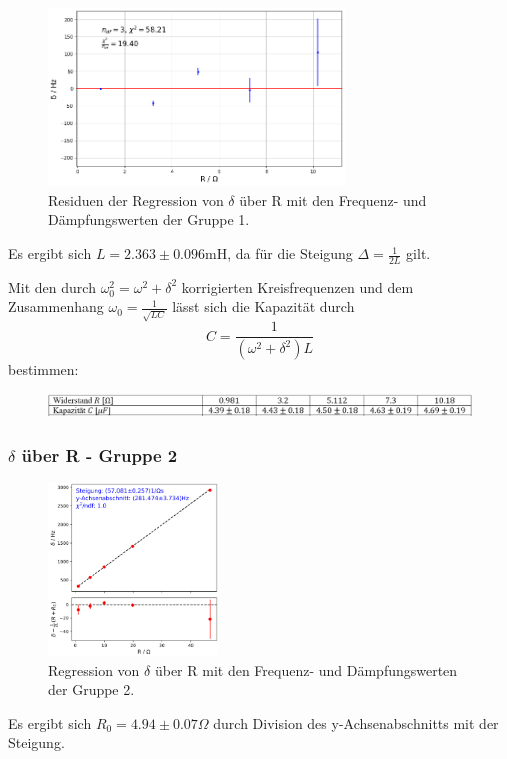 \documentclass{beamer}
\begin{document}
\begin{frame}
\begin{figure}
\centering
\includegraphics[width=0.7\textwidth]{abbildungen/LCResiduen.png}
\caption{Residuen der Regression von $\delta$ über R mit den Frequenz- und Dämpfungswerten der Gruppe 1.}
\end{figure}
Es ergibt sich $L = 2.363 \pm 0.096$mH, da für die Steigung $\Delta = \frac{1}{2L}$ gilt.
\end{frame}

\begin{frame}
Mit den durch $\omega_0^2 = \omega^2 + \delta^2$ korrigierten Kreisfrequenzen und dem Zusammenhang $\omega_0 = \frac{1}{\sqrt{LC}}$ lässt sich die Kapazität durch 
$$ C = \frac{1}{(\omega^2 + \delta^2) L}$$
bestimmen:

\begin{figure}
\includegraphics[width = \textwidth]{abbildungen/1VCWerte_mod.PNG}
\end{figure}
\end{frame}


\begin{frame}
\frametitle{$\delta$ über R - Gruppe 2}
\begin{figure}
\centering
\includegraphics[width=0.4\textwidth]{abbildungen/reg_delR.png}
\caption{Regression von $\delta$ über R mit den Frequenz- und Dämpfungswerten der Gruppe 2.}
\end{figure}
Es ergibt sich $R_0 = 4.94\pm 0.07\Omega$ durch Division des y-Achsenabschnitts mit der Steigung.
\end{frame}
\end{document}
